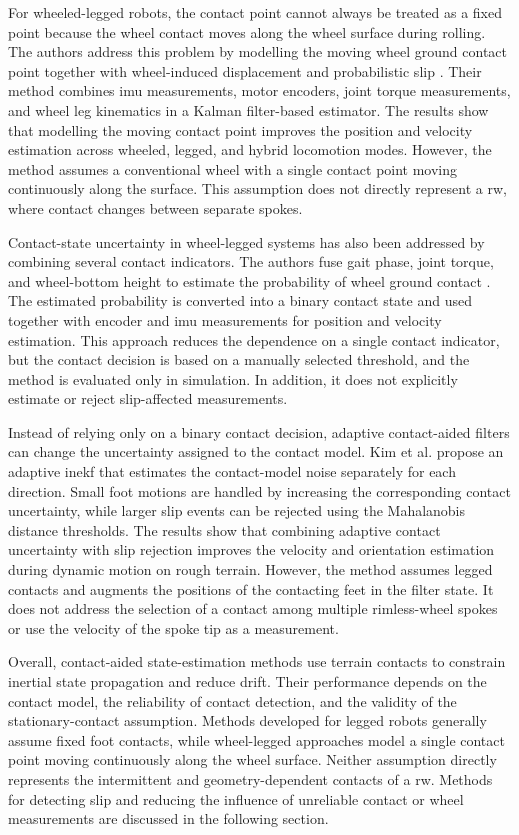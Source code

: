 \documentclass[report.tex]{subfiles}
\begin{document}
    For wheeled-legged robots, the contact point cannot always be treated as a fixed point because the wheel contact moves along the wheel surface during rolling. The authors address this problem by modelling the moving wheel ground contact point together with wheel-induced displacement and probabilistic slip \cite{Zhou2025}. Their method combines \gls{imu} measurements, motor encoders, joint torque measurements, and wheel leg kinematics in a Kalman filter-based estimator. The results show that modelling the moving contact point improves the position and velocity estimation across wheeled, legged, and hybrid locomotion modes. However, the method assumes a conventional wheel with a single contact point moving continuously along the surface. This assumption does not directly represent a \gls{rw}, where contact changes between separate spokes.

    Contact-state uncertainty in wheel-legged systems has also been addressed by combining several contact indicators. The authors fuse gait phase, joint torque, and wheel-bottom height to estimate the probability of wheel ground contact \cite{Zhang2025}. The estimated probability is converted into a binary contact state and used together with encoder and \gls{imu} measurements for position and velocity estimation. This approach reduces the dependence on a single contact indicator, but the contact decision is based on a manually selected threshold, and the method is evaluated only in simulation. In addition, it does not explicitly estimate or reject slip-affected measurements.

    Instead of relying only on a binary contact decision, adaptive contact-aided filters can change the uncertainty assigned to the contact model. Kim et al. \cite{Kim2025} propose an adaptive \gls{inekf} that estimates the contact-model noise separately for each direction. Small foot motions are handled by increasing the corresponding contact uncertainty, while larger slip events can be rejected using the Mahalanobis distance thresholds. The results show that combining adaptive contact uncertainty with slip rejection improves the velocity and orientation estimation during dynamic motion on rough terrain. However, the method assumes legged contacts and augments the positions of the contacting feet in the filter state. It does not address the selection of a contact among multiple rimless-wheel spokes or use the velocity of the spoke tip as a measurement.

    Overall, contact-aided state-estimation methods use terrain contacts to constrain inertial state propagation and reduce drift. Their performance depends on the contact model, the reliability of contact detection, and the validity of the stationary-contact assumption. Methods developed for legged robots generally assume fixed foot contacts, while wheel-legged approaches model a single contact point moving continuously along the wheel surface. Neither assumption directly represents the intermittent and geometry-dependent contacts of a \gls{rw}. Methods for detecting slip and reducing the influence of unreliable contact or wheel measurements are discussed in the following section.
\end{document}
